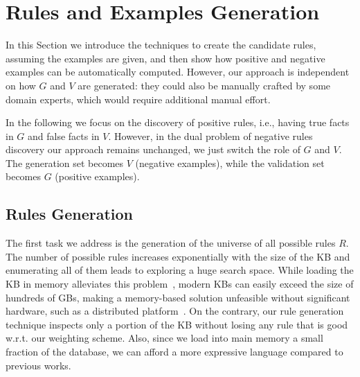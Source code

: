 \section{Rules and Examples Generation} \label{sec:rules_gen}
In this Section we introduce the techniques to create the candidate rules, assuming the examples are given, and then show how positive and negative examples can be automatically computed. However, our approach is independent on how $G$ and $V$ are generated: they could also be manually crafted by some domain experts, which would require additional manual effort.

In the following we focus on the discovery of positive rules, i.e., having true facts in $G$ and false facts in $V$.
However, in the dual problem of negative rules discovery our approach remains unchanged, we just switch the role of $G$ and $V$. The generation set becomes $V$ (negative examples), while the validation set becomes $G$ (positive examples). 




\subsection{Rules Generation} \label{sec:rules_generation}
The first task we address is the generation of the universe of all possible rules $R$. 
The number of possible rules increases exponentially with the size of the KB and enumerating all of them leads to exploring a huge search space. 
While loading the KB in memory alleviates this problem~\cite{galarraga2015fast,Chen:2016}, modern KBs can easily exceed the size of hundreds of GBs, making a memory-based solution unfeasible without significant hardware, such as a distributed platform~\cite{Chen:2016,DBLP:conf/sigmod/FaridRIHC16}. On the contrary, our rule generation technique inspects only a portion of the KB without losing any rule that is good w.r.t. our weighting scheme. Also, since we load into main memory a small fraction of the database, we can afford a more expressive language compared to previous works. %


